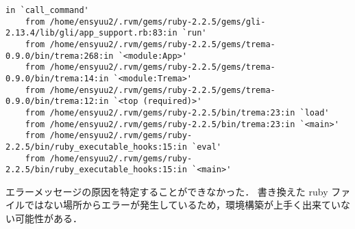 ﻿\documentclass[10pt,a4paper,onecolumn]{jarticle}
\begin{document}
\begin{lstlisting}[caption = 動作結果, label = lst:result]
		in `call_command'
	from /home/ensyuu2/.rvm/gems/ruby-2.2.5/gems/gli-2.13.4/lib/gli/app_support.rb:83:in `run'
	from /home/ensyuu2/.rvm/gems/ruby-2.2.5/gems/trema-0.9.0/bin/trema:268:in `<module:App>'
	from /home/ensyuu2/.rvm/gems/ruby-2.2.5/gems/trema-0.9.0/bin/trema:14:in `<module:Trema>'
	from /home/ensyuu2/.rvm/gems/ruby-2.2.5/gems/trema-0.9.0/bin/trema:12:in `<top (required)>'
	from /home/ensyuu2/.rvm/gems/ruby-2.2.5/bin/trema:23:in `load'
	from /home/ensyuu2/.rvm/gems/ruby-2.2.5/bin/trema:23:in `<main>'
	from /home/ensyuu2/.rvm/gems/ruby-2.2.5/bin/ruby_executable_hooks:15:in `eval'
	from /home/ensyuu2/.rvm/gems/ruby-2.2.5/bin/ruby_executable_hooks:15:in `<main>'
\end{lstlisting}

エラーメッセージの原因を特定することができなかった．
書き換えた ruby ファイルではない場所からエラーが発生しているため，環境構築が上手く出来ていない可能性がある． 
\end{document}
